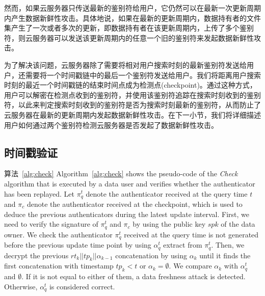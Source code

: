 然而，如果云服务器只传送最新的鉴别符给用户，它仍然可以在最新一次更新周期内产生数据新鲜性攻击。具体地说，如果在最新的更新周期内，数据持有者的文件集产生了一次或者多次的更新，即数据持有者在该更新周期内，上传了多个鉴别符，则云服务器可以发送该更新周期内的任意一个旧的鉴别符来发起数据新鲜性攻击。

为了解决该问题，云服务器除了需要将相对用户搜索时刻的最新鉴别符发送给用户，还需要将一个时间戳链中的最后一个鉴别符发送给用户。我们将距离用户搜索时刻的最近一个时间戳链的结束时间点成为检测点(checkpoint)。通过这种方式，用户可以解密在检测点收到的鉴别符，并使用该鉴别符追踪在搜索时刻收到的鉴别符，以此来判定搜索时刻收到的鉴别符是否为搜索时刻最新的鉴别符，从而防止了云服务器在最新的更新周期内发起数据新鲜性攻击。在下一小节，我们将详细描述用户如何通过两个鉴别符检测云服务器是否发起了数据新鲜性攻击。


\subsection{时间戳验证}
算法~\ref{alg:check}
Algorithm~\ref{alg:check} shows the pseudo-code of the {\it Check} algorithm that is executed by a data user and verifies whether the authenticator has been replayed. Let $\pi^t_q$ denote the authenticator received at the query time $t$ and $\pi_c$ denote the authenticator received at the checkpoint, which is used to deduce the previous authenticators during the latest update interval. First, we need to verify the signature of $\pi^t_q$ and $\pi_c$ by using the public key $spk$ of the data owner. We check the authenticator $\pi^t_q$ received at the query time is not generated before the previous update time point by using $\alpha^t_q$ extract from $\pi^t_q$. Then, we decrypt the previous $rt_k||tp_k||\alpha_{k-1}$ concatenation by using $\alpha_k$ until it finds the first concatenation with timestamp $tp_k < t$ or $\alpha_k = \emptyset$. We compare $\alpha_k$ with $\alpha^t_q$ and $\emptyset$. If it is not equal to either of them, a data freshness attack is detected. Otherwise, $\alpha^t_q$ is considered correct.

